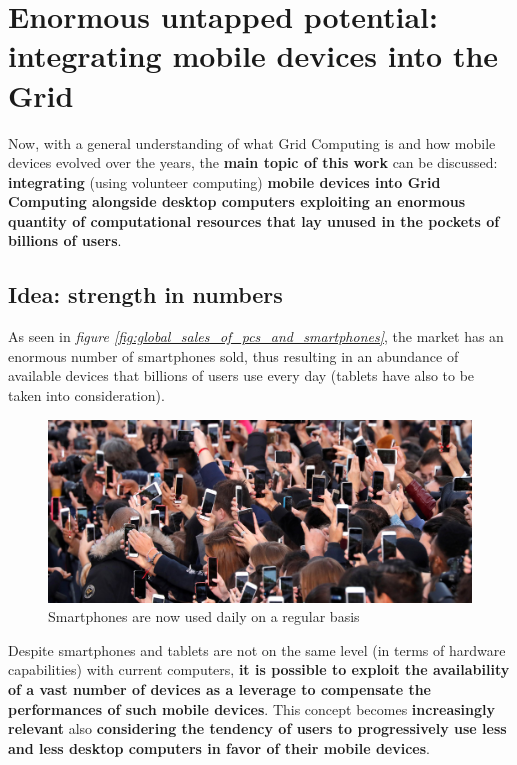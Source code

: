 \section{Enormous untapped potential: integrating mobile devices into the Grid}\label{untapped_enormous_potential}
Now, with a general understanding of what Grid Computing is and how mobile devices evolved over the years, the \textbf{main topic of this work} can be discussed: \textbf{integrating} (using volunteer computing) \textbf{mobile devices into Grid Computing alongside desktop computers exploiting an enormous quantity of computational resources that lay unused in the pockets of billions of users}.

\subsection{Idea: strength in numbers}
As seen in \textit{figure \ref{fig:global_sales_of_pcs_and_smartphones}}, the market has an enormous number of smartphones sold, thus resulting in an abundance of available devices that billions of users use every day (tablets have also to be taken into consideration).
\vspace{10mm}

\begin{figure}[!ht]
    \centering
    \includegraphics[scale=1.2]{document/chapters/chapter_1/images/people_using_smartphones.jpg}
    \caption{Smartphones are now used daily on a regular basis}
    \label{fig:people_using_smartphones}
\end{figure}

Despite smartphones and tablets are not on the same level (in terms of hardware capabilities) with current computers, \textbf{it is possible to exploit the availability of a vast number of devices as a leverage to compensate the performances of such mobile devices}.
This concept becomes \textbf{increasingly relevant} also \textbf{considering the tendency of users to progressively use less and less desktop computers in favor of their mobile devices}.

